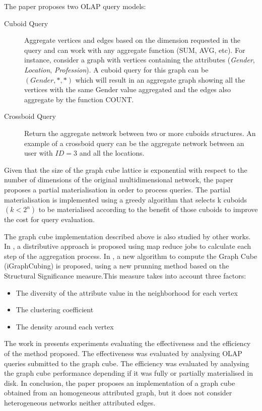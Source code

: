 The paper proposes two OLAP query models:
\begin{description}
\item[Cuboid Query] Aggregate vertices and edges based on the dimension requested in the query and can work with any aggregate function (SUM, AVG, etc). For instance, consider a graph with vertices containing the attributes (\emph{Gender}, \emph{Location}, \emph{Profession}). A cuboid query for this graph can be $(Gender, *, *)$ which will result in an aggregate graph showing all the vertices with the same Gender value aggregated and the edges also aggregate by the function COUNT.
\item[Crossboid Query] Return the aggregate network between two or more cuboids structures. An example of a crossboid query can be the aggregate network between an user with $ID = 3$ and all the locations.
\end{description}

Given that the size of the graph cube lattice is exponential with respect to the number of dimensions of the original multidimensional network, the paper proposes a partial materialisation in order to process queries. The partial materialisation is implemented using a greedy algorithm that selects k cuboids $(k < 2^n)$ to be materialised according to the benefit of those cuboids to improve the cost for query evaluation.
 
The graph cube implementation described above is also studied by other works. In \cite{Denis2013}, a distributive approach is proposed using map reduce jobs to calculate each step of the aggregation process. In \cite{Khan2014}, a new algorithm to compute the Graph Cube (iGraphCubing) is proposed, using a new prunning method based on the Structural Significance measure.This measure takes into account three factors:
 
\begin{itemize}
\item The diversity of the attribute value in the neighborhood for each vertex
\item The clustering coefficient
\item The density around each vertex
\end{itemize}

The work in \cite{Zhao2011} presents experiments evaluating the effectiveness and the efficiency of the method proposed. The effectiveness was evaluated by analysing OLAP queries submitted to the graph cube. The efficiency was evaluated by analysing the graph cube performance depending if it was fully or partially materialised in disk. In conclusion, the paper proposes an implementation of a graph cube obtained from an homogeneous attributed graph, but it does not consider heterogeneous networks neither attributed edges.

